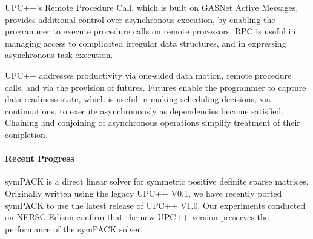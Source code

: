 UPC++'s Remote Procedure Call, which is built on GASNet Active Messages,
provides additional control over asynchronous execution, by enabling
the programmer
to execute procedure calls on remote processors.
RPC is useful in managing access to complicated irregular data structures,
and in expressing asynchronous task execution.

UPC++ addresses productivity via one-sided data motion, remote procedure calls,
and via the provision of futures.
Futures enable the programmer
to capture data readiness state, which is useful in making scheduling decisions, 
via continuations, to execute asynchronously as dependencies become
satisfied. Chaining and conjoining
of asynchronous operations simplify treatment of their completion.



\paragraph{Recent Progress}

symPACK is a direct linear solver for symmetric positive definite sparse matrices.
Originally written using the legacy UPC++ V0.1, we have recently ported symPACK to
use the latest release of UPC++ V1.0. Our experiments conducted on NERSC Edison
confirm that the new UPC++ version preserves the performance of the symPACK solver.


